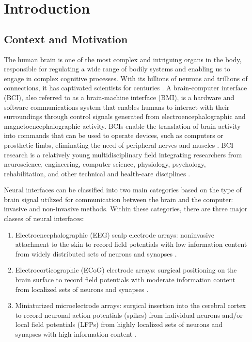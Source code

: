 \chapter{Introduction}
\section{Context and Motivation}
The human brain is one of the most complex and intriguing organs in the body, responsible for regulating a wide range of bodily systems and enabling us to engage in complex cognitive processes. With its billions of neurons and trillions of connections, it has captivated scientists for centuries \cite{bear2016neuroscience}.
A brain-computer interface (BCI), also referred to as a brain-machine interface (BMI), is a hardware and software communications system that enables humans to interact with their surroundings through control signals generated from electroencephalographic and  magnetoencephalographic activity. BCIs enable the translation of brain activity into commands that can be used to operate devices, such as computers or prosthetic limbs, eliminating the need of peripheral nerves and muscles \cite{wolpaw2012brain}.
BCI research is a relatively young multidisciplinary field integrating researchers from neuroscience, engineering, computer science, physiology, psychology, rehabilitation, and other technical and health-care disciplines \cite{wolpaw2012brain}.

Neural interfaces can be classified into two main categories based on the type of brain signal utilized for communication between the brain and the computer: invasive and non-invasive methods. Within these categories, there are three major classes of neural interfaces:
\begin{enumerate}
    \item Electroencephalographic (EEG) scalp electrode arrays: noninvasive attachment to the skin to record field potentials with low information content from widely distributed sets of neurons and synapses \cite{schwartz2004cortical}.
    \item Electrocorticographic (ECoG) electrode arrays: surgical positioning on the brain surface to record field potentials with moderate information content from localized sets of neurons and synapses \cite{schwartz2004cortical}.
    \item Miniaturized microelectrode arrays: surgical insertion into the cerebral cortex to record neuronal action potentials (spikes) from individual neurons and/or local field potentials (LFPs) from highly localized sets of neurons and synapses with high information content \cite{schwartz2004cortical}.    
\end{enumerate}

